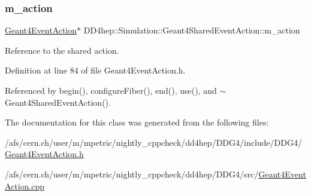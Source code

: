 \subsubsection{\texorpdfstring{m\+\_\+action}{m\_action}}
{\footnotesize\ttfamily \hyperlink{class_d_d4hep_1_1_simulation_1_1_geant4_event_action}{Geant4\+Event\+Action}$\ast$ D\+D4hep\+::\+Simulation\+::\+Geant4\+Shared\+Event\+Action\+::m\+\_\+action\hspace{0.3cm}{\ttfamily [protected]}}



Reference to the shared action. 



Definition at line 84 of file Geant4\+Event\+Action.\+h.



Referenced by begin(), configure\+Fiber(), end(), use(), and $\sim$\+Geant4\+Shared\+Event\+Action().



The documentation for this class was generated from the following files\+:\begin{DoxyCompactItemize}
\item 
/afs/cern.\+ch/user/m/mpetric/nightly\+\_\+cppcheck/dd4hep/\+D\+D\+G4/include/\+D\+D\+G4/\hyperlink{_geant4_event_action_8h}{Geant4\+Event\+Action.\+h}\item 
/afs/cern.\+ch/user/m/mpetric/nightly\+\_\+cppcheck/dd4hep/\+D\+D\+G4/src/\hyperlink{_geant4_event_action_8cpp}{Geant4\+Event\+Action.\+cpp}\end{DoxyCompactItemize}

